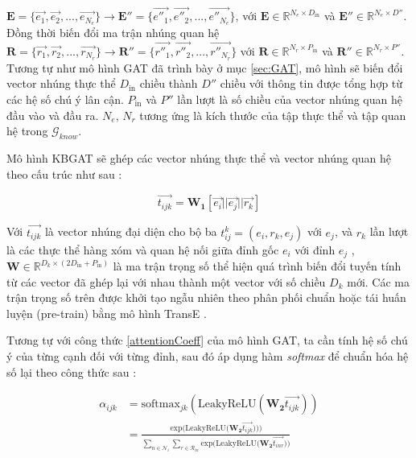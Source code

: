 $\mathbf{E} = \Big\{\overrightarrow{e_1}, \overrightarrow{e_2}, ...,  \overrightarrow{e_{N_e}}\Big\} \xrightarrow{} \mathbf{E''} = \Big\{\overrightarrow{e''_1}, \overrightarrow{e''_2}, ...,  \overrightarrow{e''_{N_e}}\Big\}$, với $\mathbf{E} \in \mathbb{R}^{N_e \times D_{\text{in}}}$ và $\mathbf{E''} \in \mathbb{R}^{N_e \times D''}$.
Đồng thời biến đổi ma trận nhúng quan hệ 
$\mathbf{R} = \Big\{\overrightarrow{r_1}, \overrightarrow{r_2}, ...,  \overrightarrow{r_{N_r}}\Big\} \xrightarrow{} \mathbf{R''} = \Big\{\overrightarrow{r''_1}, \overrightarrow{r''_2}, ...,  \overrightarrow{r''_{N_r}}\Big\}$ với $\mathbf{R} \in \mathbb{R}^{N_r \times P_{\text{in}}}$ và $\mathbf{R''} \in \mathbb{R}^{N_r \times P''}$. Tương tự như mô hình GAT đã trình bày ở mục \ref{sec:GAT}, mô hình sẽ biến đổi vector nhúng thực thể $D_{\text{in}}$ chiều thành $D''$ chiều với thông tin được tổng hợp từ các hệ số chú ý lân cận. $P_{\text{in}}$ và $P''$ lần lượt là số chiều của vector nhúng quan hệ đầu vào và đầu ra. $N_e$, $N_r$ tương ứng là kích thước của tập thực thể và tập quan hệ trong $\mathcal{G}_{know}$.

Mô hình KBGAT sẽ ghép các vector nhúng thực thể và vector nhúng quan hệ theo cấu trúc như sau :

\begin{equation}
\label{attentionWithRelation}
\overrightarrow{t_{ijk}} = \mathbf{W_1} [\overrightarrow{e_i} || \overrightarrow{e_j} || \overrightarrow{r_k}]
\end{equation}

Với $\overrightarrow{t_{ijk}}$ là vector nhúng đại diện cho bộ ba  $t_{ij}^k = (e_i, r_k, e_j)$ với $e_j$, và $r_k$ lần lượt là các thực thể hàng xóm và quan hệ nối giữa đỉnh gốc $e_i$ với đỉnh $e_j$ , $\mathbf{W} \in \mathbb{R}^{D_k \times (2 D_{\text{in}} + P_{\text{in}})}$ là ma trận trọng số thể hiện quá trình biến đổi tuyến tính từ các vector đã ghép lại với nhau thành một vector với số chiều $D_k$ mới. Các ma trận trọng số trên được khởi tạo ngẫu nhiên theo phân phối chuẩn hoặc tái huấn luyện (pre-train) bằng mô hình TransE \cite{bordes2013translating}.

Tương tự với công thức \ref{attentionCoeff} của mô hình GAT, ta cần tính hệ số chú ý của từng cạnh đối với từng đỉnh, sau đó áp dụng hàm \textit{softmax} để chuẩn hóa hệ số lại theo công thức sau :

\begin{equation}
\label{attentionRelationCoeff}
\begin{split}
\alpha_{ijk}& = \text{softmax}_{jk}(\text{LeakyReLU}(\mathbf{W_2} \overrightarrow{t_{ijk}}))\\
&= \frac{
	\text{exp} \Big( \text{LeakyReLU} \Big( \mathbf{W_2} \overrightarrow{t_{ijk}}\Big) \Big))
}
{
	\sum_{n\in \mathcal{N}_i} \sum_{r\in \mathcal{R}_{in}}
	\text{exp} \Big( \text{LeakyReLU} \Big( \mathbf{W_2} \overrightarrow{t_{inr}} \Big) \Big)
}
\end{split}
\end{equation}

